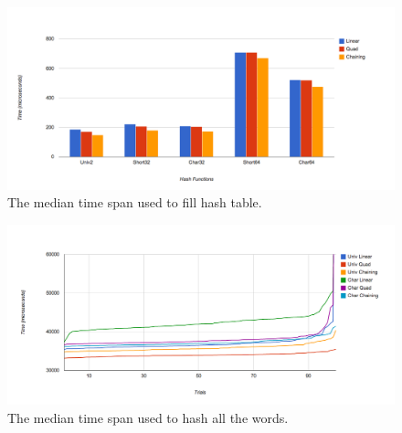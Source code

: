 \documentclass[11pt]{article}
\begin{document}
\begin{figure}
                \centering
                \includegraphics[width=\textwidth]{time-median.png}
              \caption{The median time span used to fill hash table.}
              \label{fig:timemedian}
\end{figure}


\begin{figure}
                \centering
                \includegraphics[width=\textwidth]{string-time.png}
              \caption{The median time span used to hash all the words.}
              \label{fig:string-time}
\end{figure}
\end{document}
